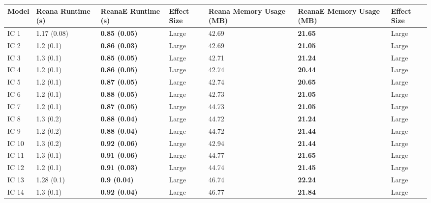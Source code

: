 \begin{tabular}{lllllll}
\toprule
 Model & Reana Runtime (s) &    ReanaE Runtime (s) & Effect Size & Reana Memory Usage (MB) & ReanaE Memory Usage (MB) & Effect Size \\
\midrule
  IC 1 &       1.17 (0.08) &  \textbf{0.85 (0.05)} &       Large &                   42.69 &           \textbf{21.65} &       Large \\
  IC 2 &         1.2 (0.1) &  \textbf{0.86 (0.03)} &       Large &                   42.69 &           \textbf{21.05} &       Large \\
  IC 3 &         1.3 (0.1) &  \textbf{0.85 (0.05)} &       Large &                   42.71 &           \textbf{21.24} &       Large \\
  IC 4 &         1.2 (0.1) &  \textbf{0.86 (0.05)} &       Large &                   42.74 &           \textbf{20.44} &       Large \\
  IC 5 &         1.2 (0.1) &  \textbf{0.87 (0.05)} &       Large &                   42.74 &           \textbf{20.65} &       Large \\
  IC 6 &         1.2 (0.1) &  \textbf{0.88 (0.05)} &       Large &                   42.73 &           \textbf{21.05} &       Large \\
  IC 7 &         1.2 (0.1) &  \textbf{0.87 (0.05)} &       Large &                   44.73 &           \textbf{21.05} &       Large \\
  IC 8 &         1.3 (0.2) &  \textbf{0.88 (0.04)} &       Large &                   44.72 &           \textbf{21.24} &       Large \\
  IC 9 &         1.2 (0.2) &  \textbf{0.88 (0.04)} &       Large &                   44.72 &           \textbf{21.44} &       Large \\
 IC 10 &         1.3 (0.2) &  \textbf{0.92 (0.06)} &       Large &                   42.94 &           \textbf{21.44} &       Large \\
 IC 11 &         1.3 (0.1) &  \textbf{0.91 (0.06)} &       Large &                   44.77 &           \textbf{21.65} &       Large \\
 IC 12 &         1.2 (0.1) &  \textbf{0.91 (0.03)} &       Large &                   44.74 &           \textbf{21.45} &       Large \\
 IC 13 &        1.28 (0.1) &   \textbf{0.9 (0.04)} &       Large &                   46.74 &           \textbf{22.24} &       Large \\
 IC 14 &         1.3 (0.1) &  \textbf{0.92 (0.04)} &       Large &                   46.77 &           \textbf{21.84} &       Large \\

\end{tabular}
